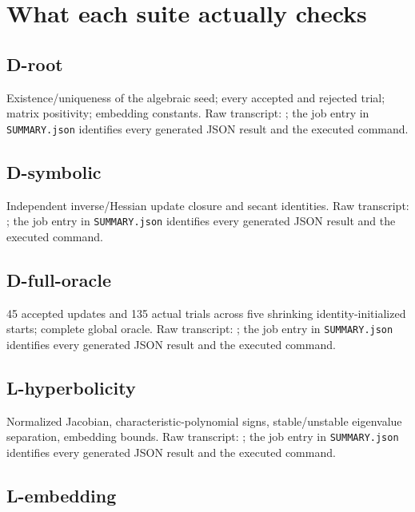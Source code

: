 \section{What each suite actually checks}\label{what-each-suite-actually-checks}

\subsection{D-root}\label{d-root}

Existence/uniqueness of the algebraic seed; every accepted and rejected trial; matrix positivity; embedding constants. Raw transcript: ; the job entry in \texttt{SUMMARY.json} identifies every generated JSON result and the executed command.

\subsection{D-symbolic}\label{d-symbolic}

Independent inverse/Hessian update closure and secant identities. Raw transcript: ; the job entry in \texttt{SUMMARY.json} identifies every generated JSON result and the executed command.

\subsection{D-full-oracle}\label{d-full-oracle}

45 accepted updates and 135 actual trials across five shrinking identity-initialized starts; complete global oracle. Raw transcript: ; the job entry in \texttt{SUMMARY.json} identifies every generated JSON result and the executed command.

\subsection{L-hyperbolicity}\label{l-hyperbolicity}

Normalized Jacobian, characteristic-polynomial signs, stable/unstable eigenvalue separation, embedding bounds. Raw transcript: ; the job entry in \texttt{SUMMARY.json} identifies every generated JSON result and the executed command.

\subsection{L-embedding}\label{l-embedding}

